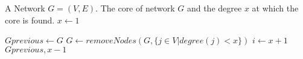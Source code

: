 \pagebreak

\newcommand{\FindCore}{\ensuremath{\mbox{\sc FindCore}}}
\begin{algorithm}[htb]
\caption{$\FindCore(Network)$}\label{alg:findcore}
\begin{algorithmic}
\REQUIRE A Network $G=(V,E)$.
\ENSURE The core of network $G$ and the degree $x$ at which the core is found.
\medskip
\STATE $x\gets 1$
	
	\STATE $Gprevious \gets G$
		\STATE $G\gets removeNodes(G, \{j\in V | degree(j)<x\})$ 
	\ENDWHILE
	\STATE $i \gets x+1$
\ENDWHILE
\RETURN $Gprevious, x-1$
\end{algorithmic}
\end{algorithm}